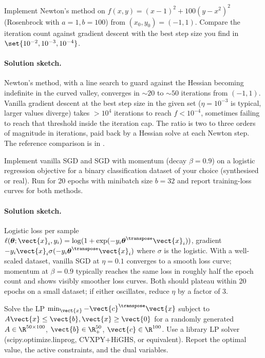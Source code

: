 \begin{exercise}
Implement Newton's method on $f(x, y) = (x - 1)^{2} + 100
(y - x^{2})^{2}$ (Rosenbrock with $a = 1, b = 100$) from
$(x_{0}, y_{0}) = (-1, 1)$. Compare the iteration count against
gradient descent with the best step size you find in $\set{10^{-2},
10^{-3}, 10^{-4}}$.
\end{exercise}

\paragraph{Solution sketch.}
Newton's method, with a line search to guard against the Hessian
becoming indefinite in the curved valley, converges in $\sim 20$
to $\sim 50$ iterations from $(-1, 1)$. Vanilla gradient descent
at the best step size in the given set ($\eta = 10^{-3}$ is
typical, larger values diverge) takes $> 10^{4}$ iterations to
reach $f < 10^{-4}$, sometimes failing to reach that threshold
inside the iteration cap. The ratio is two to three orders of
magnitude in iterations, paid back by a Hessian solve at each
Newton step. The reference comparison is in
.

\begin{exercise}
Implement vanilla SGD and SGD with momentum (decay $\beta = 0.9$)
on a logistic regression objective for a binary classification
dataset of your choice (synthesised or real). Run for 20 epochs
with minibatch size $b = 32$ and report training-loss curves for
both methods.
\end{exercise}

\paragraph{Solution sketch.}
Logistic loss per sample $\ell(\boldsymbol{\theta}; \vect{x}_{i},
y_{i}) = \log(1 + \exp(-y_{i} \boldsymbol{\theta}^{\transpose}
\vect{x}_{i}))$, gradient $-y_{i} \vect{x}_{i} \sigma(-y_{i}
\boldsymbol{\theta}^{\transpose} \vect{x}_{i})$ where $\sigma$ is
the logistic. With a well-scaled dataset, vanilla SGD at $\eta =
0.1$ converges to a smooth loss curve; momentum at $\beta = 0.9$
typically reaches the same loss in roughly half the epoch count
and shows visibly smoother loss curves. Both should plateau within
20 epochs on a small dataset; if either oscillates, reduce
$\eta$ by a factor of $3$.

\begin{exercise}
Solve the LP $\min_{\vect{x}} -\vect{c}^{\transpose} \vect{x}$
subject to $A \vect{x} \leq \vect{b}, \vect{x} \geq \vect{0}$ for
a randomly generated $A \in \R^{50 \times 100}$, $\vect{b} \in
\R^{50}_{+}$, $\vect{c} \in \R^{100}$. Use a library LP solver
(scipy.optimize.linprog, CVXPY+HiGHS, or equivalent). Report the
optimal value, the active constraints, and the dual variables.
\end{exercise}

